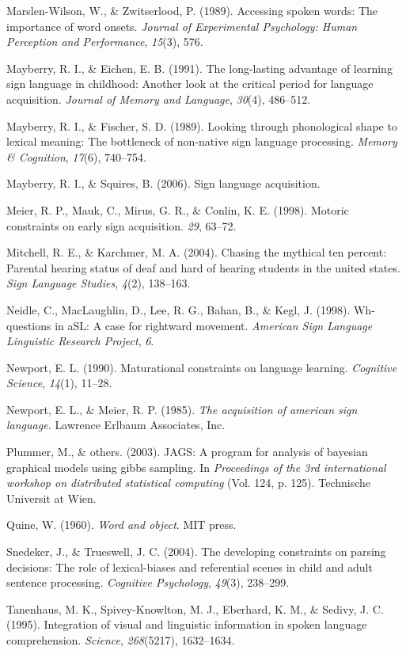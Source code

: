 \documentclass[12pt,]{article}
\begin{document}
Marslen-Wilson, W., \& Zwitserlood, P. (1989). Accessing spoken words:
The importance of word onsets. \emph{Journal of Experimental Psychology:
Human Perception and Performance}, \emph{15}(3), 576.

Mayberry, R. I., \& Eichen, E. B. (1991). The long-lasting advantage of
learning sign language in childhood: Another look at the critical period
for language acquisition. \emph{Journal of Memory and Language},
\emph{30}(4), 486--512.

Mayberry, R. I., \& Fischer, S. D. (1989). Looking through phonological
shape to lexical meaning: The bottleneck of non-native sign language
processing. \emph{Memory \& Cognition}, \emph{17}(6), 740--754.

Mayberry, R. I., \& Squires, B. (2006). Sign language acquisition.

Meier, R. P., Mauk, C., Mirus, G. R., \& Conlin, K. E. (1998). Motoric
constraints on early sign acquisition. \emph{29}, 63--72.

Mitchell, R. E., \& Karchmer, M. A. (2004). Chasing the mythical ten
percent: Parental hearing status of deaf and hard of hearing students in
the united states. \emph{Sign Language Studies}, \emph{4}(2), 138--163.

Neidle, C., MacLaughlin, D., Lee, R. G., Bahan, B., \& Kegl, J. (1998).
Wh-questions in aSL: A case for rightward movement. \emph{American Sign
Language Linguistic Research Project}, \emph{6}.

Newport, E. L. (1990). Maturational constraints on language learning.
\emph{Cognitive Science}, \emph{14}(1), 11--28.

Newport, E. L., \& Meier, R. P. (1985). \emph{The acquisition of
american sign language.} Lawrence Erlbaum Associates, Inc.

Plummer, M., \& others. (2003). JAGS: A program for analysis of bayesian
graphical models using gibbs sampling. In \emph{Proceedings of the 3rd
international workshop on distributed statistical computing} (Vol. 124,
p. 125). Technische Universit at Wien.

Quine, W. (1960). \emph{Word and object}. MIT press.

Snedeker, J., \& Trueswell, J. C. (2004). The developing constraints on
parsing decisions: The role of lexical-biases and referential scenes in
child and adult sentence processing. \emph{Cognitive Psychology},
\emph{49}(3), 238--299.

Tanenhaus, M. K., Spivey-Knowlton, M. J., Eberhard, K. M., \& Sedivy, J.
C. (1995). Integration of visual and linguistic information in spoken
language comprehension. \emph{Science}, \emph{268}(5217), 1632--1634.
\end{document}
